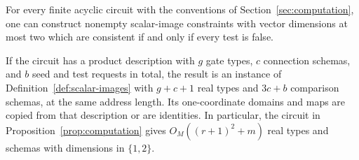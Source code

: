 \begin{proposition}\label{prop:consistency}
For every finite acyclic circuit with the conventions of
Section~\ref{sec:computation}, one can construct nonempty scalar-image
constraints with vector dimensions at most two which are consistent if
and only if every test is false.

If the circuit has a product description with $g$ gate types, $c$
connection schemas, and $b$ seed and test requests in total, the result is
an instance of Definition~\ref{def:scalar-images} with $g+c+1$
real types and $3c+b$ comparison schemas, at the same address length.
Its one-coordinate domains and maps are copied from that description or
are identities. In particular, the circuit in
Proposition~\ref{prop:computation} gives
$O_M((r+1)^2+m)$ real types and schemas with dimensions in $\{1,2\}$.
\end{proposition}

